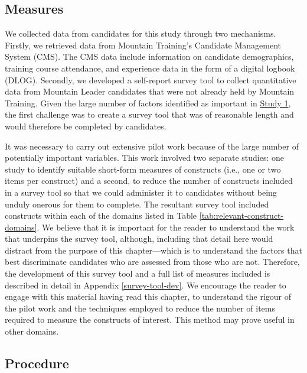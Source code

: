 \documentclass[
  12pt,
  a4paper,
]{book}
\begin{document}
\hypertarget{pra-measures}{%
\subsection{Measures}\label{pra-measures}}

We collected data from candidates for this study through two mechanisms. Firstly, we retrieved data from Mountain Training's Candidate Management System (CMS). The CMS data include information on candidate demographics, training course attendance, and experience data in the form of a digital logbook (DLOG). Secondly, we developed a self-report survey tool to collect quantitative data from Mountain Leader candidates that were not already held by Mountain Training. Given the large number of factors identified as important in \protect\hyperlink{ml-qualitative}{Study 1}, the first challenge was to create a survey tool that was of reasonable length and would therefore be completed by candidates.

It was necessary to carry out extensive pilot work because of the large number of potentially important variables. This work involved two separate studies: one study to identify suitable short-form measures of constructs (i.e., one or two items per construct) and a second, to reduce the number of constructs included in a survey tool so that we could administer it to candidates without being unduly onerous for them to complete. The resultant survey tool included constructs within each of the domains listed in Table \ref{tab:relevant-construct-domains}. We believe that it is important for the reader to understand the work that underpins the survey tool, although, including that detail here would distract from the purpose of this chapter---which is to understand the factors that best discriminate candidates who are assessed from those who are not. Therefore, the development of this survey tool and a full list of measures included is described in detail in Appendix \ref{survey-tool-dev}. We encourage the reader to engage with this material having read this chapter, to understand the rigour of the pilot work and the techniques employed to reduce the number of items required to measure the constructs of interest. This method may prove useful in other domains.

\hypertarget{pra-procedure}{%
\subsection{Procedure}\label{pra-procedure}}
\end{document}
